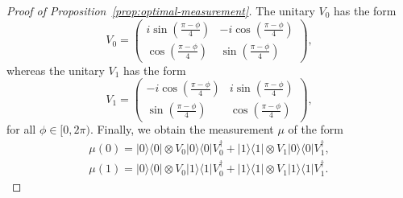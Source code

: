 \documentclass[preprint,12pt, a4paper]{elsarticle}
\newcommand{\ket}[1]{\ensuremath{|#1\rangle}}
\newcommand{\bra}[1]{\ensuremath{\langle#1|}}
\newcommand{\ketbra}[2]{\ensuremath{\ket{#1}\bra{#2}}}
\newcommand{\proj}[1]{\ensuremath{\ketbra{#1}{#1}}}
\newcommand{\1}{{\rm 1\hspace{-0.9mm}l}}
\begin{document}
\begin{proof}[Proof of Proposition~\ref{prop:optimal-measurement}]
	The unitary $V_0$ has the form
	\begin{equation}
	V_0 = \left(
	\begin{array}{cc}i \sin\left( \frac{\pi - \phi}{4} \right)&-i 
	\cos\left( \frac{\pi - \phi}{4} \right)\\ \cos\left( \frac{\pi - 
		\phi}{4}\right)& \sin\left( \frac{\pi - \phi}{4} \right)
	\end{array}
	\right),
	\end{equation}
	whereas the unitary  $V_1$  has the form
	\begin{equation}
	V_1 = \left(\begin{array}{cc}-i \cos\left(\frac{\pi - \phi}{4}\right) &i 
	\sin\left( \frac{\pi - \phi}{4}\right)\\\sin\left( \frac{\pi - \phi}{4} 
	\right) &  \cos\left( \frac{\pi - \phi}{4} \right) \end{array}\right),
	\end{equation}
	for all $\phi \in [0,2\pi)$. 
	Finally, we obtain the measurement $\mu$ of the form
	\begin{equation}
	\begin{split}
	\mu(0) = \proj{0} \otimes V_0 \proj{0} V_0^\dagger +  \proj{1} \otimes V_1 
	\proj{0} V_1^\dagger, \\ 
	\mu(1) = \proj{0} \otimes V_0 \proj{1} V_0^\dagger +  \proj{1} \otimes V_1 
	\proj{1} V_1^\dagger.  
	\end{split}
	\end{equation} 
\end{proof}
\end{document}
